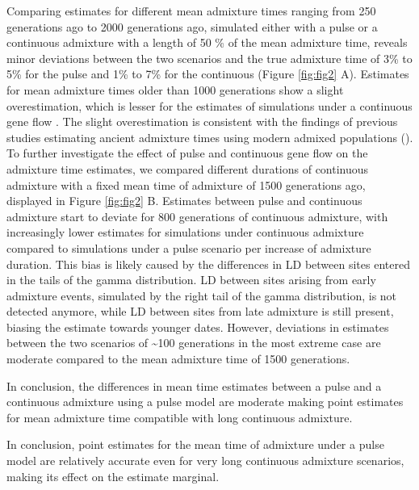 \documentclass[]{article}
\begin{document}
Comparing estimates for different mean admixture times ranging from 250
generations ago to 2000 generations ago, simulated either with a pulse
or a continuous admixture with a length of 50 \% of the mean admixture
time, reveals minor deviations between the two scenarios and the true
admixture time of 3\% to 5\% for the pulse and 1\% to 7\% for the
continuous (Figure \ref{fig:fig2} A). Estimates for mean admixture times
older than 1000 generations show a slight overestimation, which is
lesser for the estimates of simulations under a continuous gene flow .
The slight overestimation is consistent with the findings of previous
studies estimating ancient admixture times using modern admixed
populations
(\cite{sankararaman_date_2012,fu_genome_2014,moorjani_genetic_2016}). To
further investigate the effect of pulse and continuous gene flow on the
admixture time estimates, we compared different durations of continuous
admixture with a fixed mean time of admixture of 1500
generations ago, displayed in Figure \ref{fig:fig2} B. Estimates between
pulse and continuous admixture start to deviate for 800 generations of
continuous admixture, with increasingly lower estimates for simulations
under continuous admixture compared to simulations under a pulse scenario per increase of admixture duration. This bias is likely caused
by the differences in LD between sites entered in the tails of the gamma
distribution. LD between sites arising from early admixture events,
simulated by the right tail of the gamma distribution, is not detected
anymore, while LD between sites from late admixture is still present,
biasing the estimate towards younger dates. However, deviations in
estimates between the two scenarios of \textasciitilde{}100 generations
in the most extreme case are moderate compared to the mean admixture
time of 1500 generations.

In conclusion, the differences in mean time estimates between a pulse and a continuous admixture using a pulse model are moderate making point estimates for mean admixture time compatible with long continuous admixture.

In conclusion, point estimates for the mean time of admixture under a pulse model are relatively accurate even for very long continuous admixture scenarios, making its effect on the estimate marginal.
\end{document}
